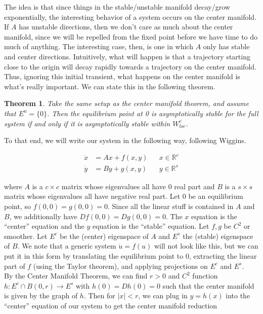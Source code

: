 \documentclass{article}
\newtheorem{theorem}{Theorem}[section]
\def\R{{\mathbb R}}
\begin{document}
The idea is that since things in the stable/unstable manifold decay/grow exponentially, the interesting behavior of a system occurs on the center manifold. If $A$ has unstable directions, then we don't care as much about the center manifold, since we will be repelled from the fixed point before we have time to do much of anything. The interesting case, then, is one in which $A$ only has stable and center directions. Intuitively, what will happen is that a trajectory starting close to the origin will decay rapidly towards a trajectory on the center manifold. Thus, ignoring this initial transient, what happens on the center manifold is what's really important. We can state this in the following theorem.

\begin{theorem}
Take the same setup as the center manifold theorem, and assume that $E^u = \{0 \}$. Then the equilibrium point at 0 is asymptotically stable for the full system if and only if it is asymptotically stable within $W^c_{loc}$.
\end{theorem}

To that end, we will write our system in the following way, following Wiggins.

\begin{align}
\dot{x} &= Ax + f(x, y) && x \in \R^c \\
\dot{y} &= By + g(x, y) && y \in \R^s
\end{align}

where $A$ is a $c \times c$ matrix whose eigenvalues all have 0 real part and $B$ is a $s \times s$ matrix whose eigenvalues all have negative real part. Let 0 be an equilibrium point, so $f(0, 0) = g(0, 0) = 0$. Since all the linear stuff is contained in $A$ and $B$, we additionally have $Df(0, 0) = Dg(0, 0) = 0$. The $x$ equation is the ``center'' equation and the $y$ equation is the ``stable'' equation. Let $f, g$ be $C^2$ or smoother. Let $E^c$ be the (center) eigenspace of $A$ and $E^s$ the (stable) eigenspace of $B$. We note that a generic system $\dot{u} = f(u)$ will not look like this, but we can put it in this form by translating the equilibrium point to 0, extracting the linear part of $f$ (using the Taylor theorem), and applying projections on $E^c$ and $E^s$.
\\

By the Center Manifold Theorem, we can find $r > 0$ and $C^2$ function $h: E^c \cap B(0, r) \rightarrow E^s$ with $h(0) = Dh(0) = 0$ such that the center manifold is given by the graph of $h$. Then for $|x| < r$, we can plug in $y = h(x)$ into the ``center'' equation of our system to get the center manifold reduction
\end{document}
